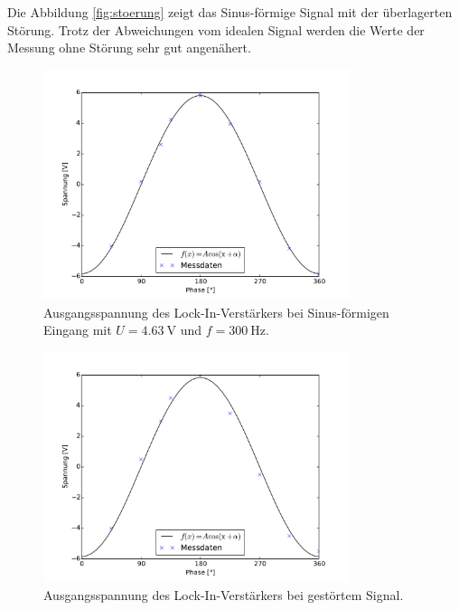 Die Abbildung \ref{fig:stoerung} zeigt das Sinus-förmige Signal mit der überlagerten Störung. 
Trotz der Abweichungen vom idealen Signal werden die Werte der Messung ohne Störung sehr gut angenähert.
\begin{figure}[hp]
	\centering
	\includegraphics[width=0.8\textwidth]{Bilder/AusgangSpannung.pdf}
	\caption{Ausgangsspannung des Lock-In-Verstärkers bei Sinus-förmigen Eingang mit $U = \SI{4.63}{\volt}$ und $f = \SI{300}{\hertz}$.}
	\label{diag:spannung}
\end{figure}

\begin{figure}[hp]
	\centering
	\includegraphics[width=0.8\textwidth]{Bilder/AusgangStoerung.pdf}
	\caption{Ausgangsspannung des Lock-In-Verstärkers bei gestörtem Signal.}
	\label{diag:stoerung}
\end{figure}


